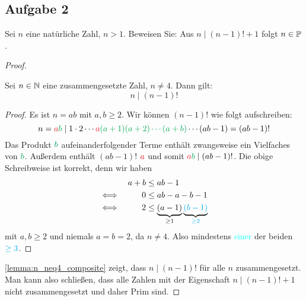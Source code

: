 \subsection{Aufgabe 2}
Sei $n$ eine natürliche Zahl, $n > 1$. Beweisen Sie: Aus $n \mid (n - 1)! + 1$
folgt $n \in \mathbb{P}$.
\begin{proof}
  \begin{lemma}
    \label{lemma:n_neq4_composite}
    Sei $n \in \mathbb{N}$ eine zusammengesetzte Zahl, $n \neq 4$. Dann gilt:
    \begin{equation*}
      n \mid (n - 1)!
    \end{equation*}
  \end{lemma}
  \begin{proof}
    Es ist $n = ab$ mit $a,b \geq 2$. Wir können $(n - 1)!$ wie folgt aufschreiben:
    \begin{equation*}
      n = \textcolor{Red}{a}\textcolor{Green}{b} \mid
      1 \cdot 2 \dotsm \textcolor{Red}{a}
      \textcolor{Green}{(a + 1)(a + 2) \dotsm (a + b)}
      \dotsm (ab - 1) = (ab - 1)!
    \end{equation*}
    Das Produkt $\textcolor{Green}{b}$ aufeinanderfolgender Terme
    enthält zwangsweise ein Vielfaches von $\textcolor{Green}{b}$.
    Außerdem enthält $(ab - 1)!$ $\textcolor{Red}{a}$ und somit
    $\textcolor{Red}{a}\textcolor{Green}{b} \mid (ab - 1)!$.\bignewline
    Die obige Schreibweise ist korrekt, denn wir haben
    \begin{equation*}
      \begin{aligned}
             &  & a + b & \leq ab - 1                                     \\
        \iff &  & 0     & \leq ab - a - b - 1                             \\
        \iff &  & 2     & \leq \underbrace{(a - 1)}_{\geq 1}
        \underbrace{\textcolor{Cyan}{(b - 1)}}_{\textcolor{Cyan}{\geq 2}} \\
      \end{aligned}
    \end{equation*}
    mit $a,b \geq 2$ und niemals $a = b = 2$, da $n \neq 4$.
    Also mindestens \textcolor{Cyan}{einer} der beiden $\textcolor{Cyan}{\geq 3}$.
  \end{proof}
  \noindent
  \autoref{lemma:n_neq4_composite} zeigt, dass $n \mid (n - 1)!$ für alle $n$ zusammengesetzt.
  Man kann also schließen, dass alle Zahlen mit der Eigenschaft $n \mid (n - 1)! + 1$
  nicht zusammengesetzt und daher Prim sind.
\end{proof}

